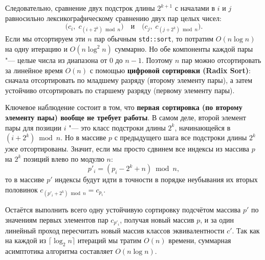 Следовательно, сравнение двух подстрок длины $2^{k+1}$ с началами в $i$ и $j$ равносильно лексикографическому сравнению двух пар целых чисел:
\[
    \bigl(c_i,\; c_{(i + 2^k) \bmod n}\bigr) \quad \text{и} \quad \bigl(c_j,\; c_{(j + 2^k) \bmod n}\bigr).
\]
Если мы отсортируем эти $n$ пар обычным \texttt{std::sort}, то потратим $O(n \log n)$ на одну итерацию и $O(n \log^2 n)$ суммарно. Но обе компоненты каждой пары "--- целые числа из диапазона от $0$ до $n-1$. Поэтому $n$ пар можно отсортировать за линейное время $O(n)$ с помощью \textbf{цифровой сортировки (Radix Sort)}: сначала отсортировать по младшему разряду (второму элементу пары), а затем устойчиво отсортировать по старшему разряду (первому элементу пары).

Ключевое наблюдение состоит в том, что \textbf{первая сортировка (по второму элементу пары) вообще не требует работы}. В самом деле, второй элемент пары для позиции $i$ "--- это класс подстроки длины $2^k$, начинающейся в $(i + 2^k) \bmod n$. Но в массиве $p$ с предыдущего шага все подстроки длины $2^k$ \emph{уже} отсортированы. Значит, если мы просто сдвинем все индексы из массива $p$ на $2^k$ позиций влево по модулю $n$:
\[
    p'_i = (p_i - 2^k + n) \bmod n,
\]
то в массиве $p'$ индексы будут идти в точности в порядке неубывания их вторых половинок $c_{(p'_i + 2^k) \bmod n} = c_{p_i}$.

Остаётся выполнить всего одну устойчивую сортировку подсчётом массива $p'$ по значениям первых элементов пар $c_{p'_i}$, получая новый массив $p$, и за один линейный проход пересчитать новый массив классов эквивалентности $c'$. Так как на каждой из $\lceil \log_2 n \rceil$ итераций мы тратим $O(n)$ времени, суммарная асимптотика алгоритма составляет $O(n \log n)$.

